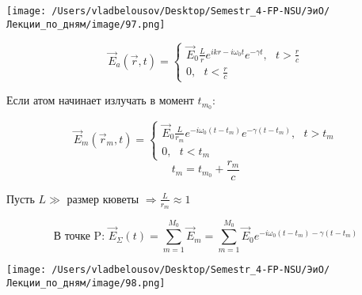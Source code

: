 \documentclass[12pt, a4paper]{report}
\begin{document}
\begin{center}
    \texttt{[image: /Users/vladbelousov/Desktop/Semestr\_4-FP-NSU/ЭиО/Лекции\_по\_дням/image/97.png]}
\end{center} 
\[ \vec{E } _a (\vec{r }   ,t ) = \begin{cases}
\displaystyle \vec{E } _0 \frac{L}{r} e^{i k r - i \omega_0 t } e^{- \gamma t } , \text{ }  t> \frac{r}{c}  \\
\displaystyle 0 , \text{ }  t < \frac{r} {c}   
\end{cases} \] 

Если атом начинает излучать в момент \( t_{m_0}       \): 

\[ \vec{E } _{m }  (\vec{r}  _m , t ) = \begin{cases}
\vec{E }_0 \frac{L}{r_m } e^{ - i \omega_0(t - t_m )} e^{- \gamma (t- t_m )} , \text{ } t>t_m\\
0 , \text{ } t<t_m    
\end{cases} \] 
\[ t_m = t_{ m_0} + \frac{ r_m }{c}   \] 

Пусть \( L\gg  \) размер кюветы \(\displaystyle  \Rightarrow \frac{L }{r_m } \approx 1   \)

\[ \text{В точке P: } \vec{E }  _{\Sigma } (t ) = \sum_{m =1} ^{M_0 }\vec{E } _m   = \sum_{m =1}^{M_0 } \vec{E } _0 e^{- i \omega_0 (t -t_m )- \gamma(t - t_m)}      \] 

\begin{center}
    \texttt{[image: /Users/vladbelousov/Desktop/Semestr\_4-FP-NSU/ЭиО/Лекции\_по\_дням/image/98.png]}
\end{center} 




\ifdefined\mainfile
\else
    
\end{document}
